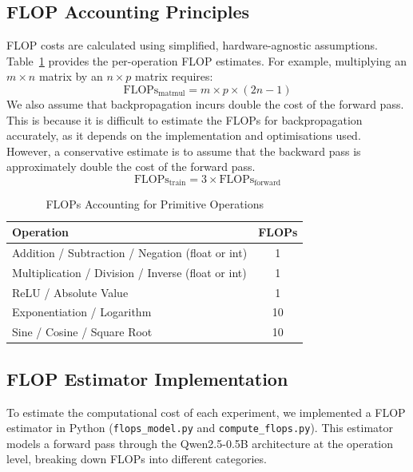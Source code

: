 \documentclass[a4paper,12pt]{article}
\begin{document}
\subsection*{FLOP Accounting Principles}

FLOP costs are calculated using simplified, hardware-agnostic assumptions. Table~\ref{tab:flops_primitives} provides the per-operation FLOP estimates. For example, multiplying an $m \times n$ matrix by an $n \times p$ matrix requires:
\begin{equation}
\text{FLOPs}_{\text{matmul}} = m \times p \times (2n - 1)
\end{equation}
We also assume that backpropagation incurs double the cost of the forward pass. This is because it is difficult to estimate the FLOPs for backpropagation accurately, as it depends on the implementation and optimisations used. However, a conservative estimate is to assume that the backward pass is approximately double the cost of the forward pass.
\begin{equation}
\text{FLOPs}_{\text{train}} = 3 \times \text{FLOPs}_{\text{forward}}
\end{equation}

\begin{table}[h]
  \centering
  \caption{FLOPs Accounting for Primitive Operations}
  \label{tab:flops_primitives}
  \begin{tabular}{lc}
    \hline
    Operation & FLOPs \\
    \hline
    Addition / Subtraction / Negation (float or int) & 1 \\
    Multiplication / Division / Inverse (float or int) & 1 \\
    ReLU / Absolute Value & 1 \\
    Exponentiation / Logarithm & 10 \\
    Sine / Cosine / Square Root & 10 \\
    \hline
  \end{tabular}
\end{table}

\subsection*{FLOP Estimator Implementation}

To estimate the computational cost of each experiment, we implemented a FLOP estimator in Python (\texttt{flops\_model.py} and \texttt{compute\_flops.py}). This estimator models a forward pass through the Qwen2.5-0.5B architecture at the operation level, breaking down FLOPs into different categories.
\end{document}
